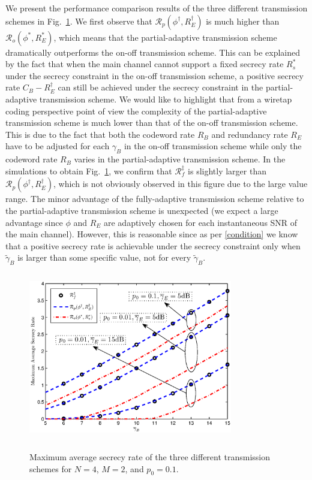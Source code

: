 \documentclass[journal]{IEEEtran}
\begin{document}
We present the performance comparison results of the three different transmission schemes in Fig.~\ref{fig:comparison}. We first observe that $\mathcal{R}_p (\phi^{\dag}, R_E^{\dag})$ is much higher than $\mathcal{R}_o (\phi^{\ast}, R_E^{\ast})$, which means that the partial-adaptive transmission scheme dramatically outperforms the on-off transmission scheme. This can be explained by the fact that when the main channel cannot support a fixed secrecy rate $R_s^{\ast}$ under the secrecy constraint in the on-off transmission scheme, a positive secrecy rate $C_B - R_E^{\dag}$ can still be achieved under the secrecy constraint in the partial-adaptive transmission scheme. We would like to highlight that from a wiretap coding perspective point of view the complexity of the partial-adaptive transmission scheme is much lower than that of the on-off transmission scheme. This is due to the fact that both the codeword rate $R_B$ and redundancy rate $R_E$ have to be adjusted for each $\gamma_B$ in the on-off transmission scheme while only the codeword rate $R_B$ varies in the partial-adaptive transmission scheme. In the simulations to obtain Fig.~\ref{fig:comparison}, we confirm that $\mathcal{R}_f^{\ddag}$ is slightly larger than $\mathcal{R}_p (\phi^{\dag}, R_E^{\dag})$, which is not obviously observed in this figure due to the large value range. The minor advantage of the fully-adaptive transmission scheme relative to the partial-adaptive transmission scheme is unexpected (we expect a large advantage since $\phi$ and $R_E$ are adaptively chosen for each instantaneous SNR of the main channel). However, this is reasonable since as per \eqref{condition} we know that a positive secrecy rate is achievable under the secrecy constraint only when $\widetilde{\gamma}_B$ is larger than some specific value, not for every $\widetilde{\gamma}_B$.

\begin{figure}[!t]
    \begin{center}
   {\includegraphics[width=3.5in, height=2.9in]{comparison_nogrid.eps}}
    \caption{Maximum average secrecy rate of the three different transmission schemes for $N = 4$, $M =2$, and $p_0 = 0.1$. }\label{fig:comparison}
    \end{center}
\end{figure}
\end{document}
